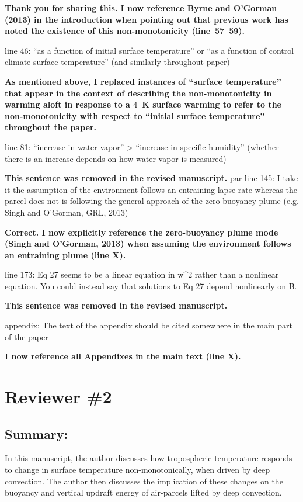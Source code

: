 \documentclass{article}
\begin{document}
\par
\textbf{Thank you for sharing this. I now reference Byrne and O'Gorman (2013) in the introduction when pointing out that previous work has noted the existence of this non-monotonicity (line~57--59).}
\par
line 46: ``as a function of initial surface temperature'' or ``as a function of control climate surface temperature'' (and similarly throughout paper)
\par
\textbf{As mentioned above, I replaced instances of ``surface temperature'' that appear in the context of describing the non-monotonicity in warming aloft in response to a $4$~K surface warming to refer to the non-monotonicity with respect to ``initial surface temperature'' throughout the paper.}
\par
line 81: ``increase in water vapor''-> ``increase in specific humidity'' (whether there is an increase depends on how water vapor is measured)
\par
\textbf{This sentence was removed in the revised manuscript.}
par
line 145: I take it the assumption of the environment follows an entraining lapse rate whereas the parcel does not is following the general approach of the zero-buoyancy plume (e.g. Singh and O'Gorman, GRL, 2013)
\par
\textbf{Correct. I now explicitly reference the zero-buoyancy plume mode (Singh and O'Gorman, 2013) when assuming the environment follows an entraining plume (line X).}
\par
line 173: Eq 27 seems to be a linear equation in w\^{}2 rather than a nonlinear equation. You could instead say that solutions to Eq 27 depend nonlinearly on B.
\par
\textbf{This sentence was removed in the revised manuscript.}
\par
appendix: The text of the appendix should be cited somewhere in the main part of the paper
\par
\textbf{I now reference all Appendixes in the main text (line X).}
\par
\section{Reviewer \#2}
\subsection{Summary:}
In this manuscript, the author discusses how tropospheric temperature responds to change in surface temperature non-monotonically, when driven by deep convection. The author then discusses the implication of these changes on the buoyancy and vertical updraft energy of air-parcels lifted by deep convection.
\end{document}
